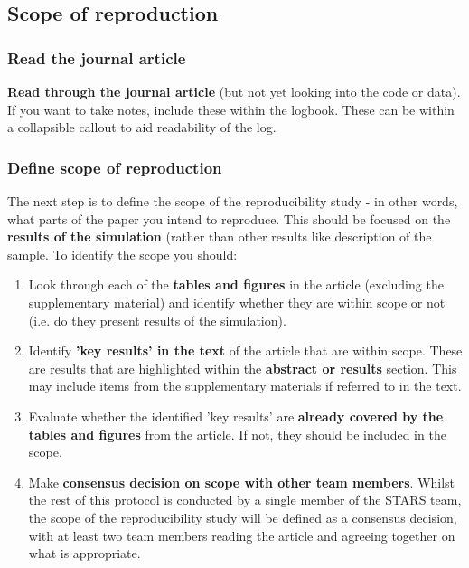 \vspace{0.5cm}
\subsection{Scope of reproduction}

\subsubsection{Read the journal article}

\textbf{Read through the journal article} (but not yet looking into the code or data). If you want to take notes, include these within the logbook. These can be within a collapsible callout to aid readability of the log.

\vspace{0.5cm}
\subsubsection{Define scope of reproduction}

The next step is to define the scope of the reproducibility study - in other words, what parts of the paper you intend to reproduce. This should be focused on the \textbf{results of the simulation} (rather than other results like description of the sample. To identify the scope you should:

\begin{enumerate}
    \item Look through each of the \textbf{tables and figures} in the article (excluding the supplementary material) and identify whether they are within scope or not (i.e. do they present results of the simulation).
    \item Identify \textbf{'key results' in the text} of the article that are within scope. These are results that are highlighted within the \textbf{abstract or results} section. This may include items from the supplementary materials if referred to in the text.
    \item Evaluate whether the identified 'key results' are \textbf{already covered by the tables and figures} from the article. If not, they should be included in the scope.
    \item Make \textbf{consensus decision on scope with other team members}. Whilst the rest of this protocol is conducted by a single member of the STARS team, the scope of the reproducibility study will be defined as a consensus decision, with at least two team members reading the article and agreeing together on what is appropriate.
\end{enumerate}

